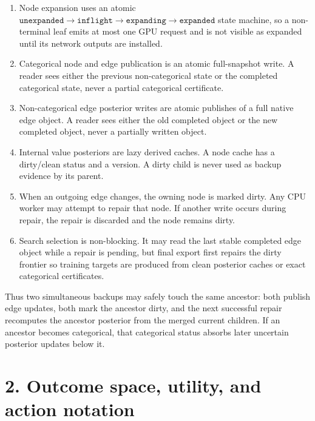 \documentclass[11pt]{article}
\begin{document}
\begin{enumerate}[leftmargin=2em]
  \item Node expansion uses an atomic
  \(\texttt{unexpanded}\rightarrow\texttt{inflight}\rightarrow
  \texttt{expanding}\rightarrow\texttt{expanded}\) state machine, so a
  non-terminal leaf emits at most one GPU request and is not visible as expanded
  until its network outputs are installed.

  \item Categorical node and edge publication is an atomic full-snapshot write.
  A reader sees either the previous non-categorical state or the completed
  categorical state, never a partial categorical certificate.

  \item Non-categorical edge posterior writes are atomic publishes of a full
  native edge object. A reader sees either the old completed object or the new
  completed object, never a partially written object.

  \item Internal value posteriors are lazy derived caches. A node cache has a
  dirty/clean status and a version. A dirty child is never used as backup
  evidence by its parent.

  \item When an outgoing edge changes, the owning node is marked dirty. Any CPU
  worker may attempt to repair that node. If another write occurs during repair,
  the repair is discarded and the node remains dirty.

  \item Search selection is non-blocking. It may read the last stable completed
  edge object while a repair is pending, but final export first repairs the dirty
  frontier so training targets are produced from clean posterior caches or exact
  categorical certificates.
\end{enumerate}

Thus two simultaneous backups may safely touch the same ancestor: both publish
edge updates, both mark the ancestor dirty, and the next successful repair
recomputes the ancestor posterior from the merged current children. If an
ancestor becomes categorical, that categorical status absorbs later uncertain
posterior updates below it.

\section*{2. Outcome space, utility, and action notation}
\end{document}
